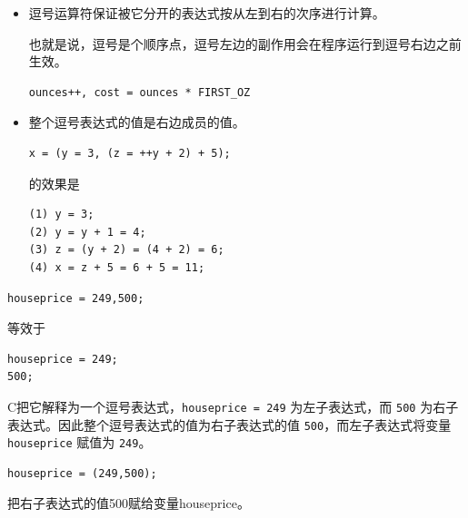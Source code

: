 \begin{frame}[fragile]\ft{\secname}
\begin{itemize}
\item
  逗号运算符保证被它分开的表达式按从左到右的次序进行计算。
  \vspace{.1in}
  
  也就是说，逗号是个顺序点，逗号左边的副作用会在程序运行到逗号右边之前生效。
\begin{lstlisting}
ounces++, cost = ounces * FIRST_OZ
\end{lstlisting}
\end{itemize}

\end{frame}

\begin{frame}[fragile]\ft{\secname}
\begin{itemize}
\item
整个逗号表达式的值是右边成员的值。
\begin{lstlisting}
x = (y = 3, (z = ++y + 2) + 5);
\end{lstlisting}
的效果是
\begin{lstlisting}
(1) y = 3;
(2) y = y + 1 = 4;
(3) z = (y + 2) = (4 + 2) = 6;
(4) x = z + 5 = 6 + 5 = 11;
\end{lstlisting}
\end{itemize}

\end{frame}

\begin{frame}[fragile]\ft{\secname}
\begin{lstlisting}
houseprice = 249,500;
\end{lstlisting}
等效于
\begin{lstlisting}
houseprice = 249;
500;
\end{lstlisting}
\pause\vspace{0.1in}

C把它解释为一个逗号表达式，\lstinline|houseprice = 249| 为左子表达式，而 \lstinline|500| 为右子表达式。因此整个逗号表达式的值为右子表达式的值 \lstinline|500|，而左子表达式将变量 \lstinline|houseprice| 赋值为 \lstinline|249|。

\end{frame}

\begin{frame}[fragile]\ft{\secname}
\begin{lstlisting}
houseprice = (249,500);
\end{lstlisting}
\pause\vspace{0.1in}

把右子表达式的值500赋给变量houseprice。
\end{frame}


